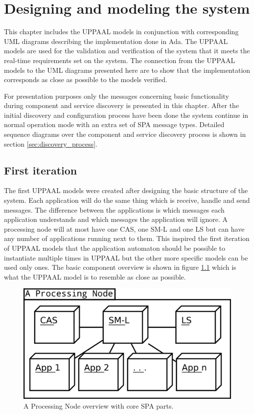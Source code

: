 \chapter{Designing and modeling the system}\label{ch:designing_and_modeling}
This chapter includes the UPPAAL models in conjunction with corresponding UML
diagrams describing the implementation done in Ada. The UPPAAL models are used
for the validation and verification of the system that it meets the real-time
requirements set on the system. The connection from the UPPAAL models to the
UML diagrams presented here are to show that the implementation corresponds as
close as possible to the models verified.

For presentation purposes only the messages concerning basic functionality
during component and service discovery is presented in this chapter. After the
initial discovery and configuration process have been done the system continue
in normal operation mode with an extra set of SPA message types. Detailed
sequence diagrams over the component and service discovery process is shown in
section \ref{sec:discovery_process}.

\section{First iteration}
The first UPPAAL models were created after designing the basic structure of the
system. Each application will do the same thing which is receive, handle
and send messages. The difference between the applications is which
messages each application understands and which messages the application will
ignore. A processing node will at most have one CAS, one SM-L and one LS
but can have any number of applications running next to them. This inspired the
first iteration of UPPAAL models that the application automaton should be
possible to instantiate multiple times in UPPAAL but the other more specific
models can be used only ones. The basic component overview is shown in figure
\ref{fig:processing_node_overview} which is what the UPPAAL model is to
resemble as close as possible.

\begin{figure}[h]
    \centering
    \includegraphics[width=\textwidth]{figures/processing_node_overview}
    \caption{A Processing Node overview with core SPA parts.}
    \label{fig:processing_node_overview}
\end{figure}


